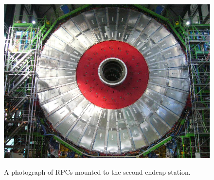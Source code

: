 \begin{figure}[H]
    \centering
    {\includegraphics[width=1\textwidth]{Images/CMS/RE.png}}
    \caption{A photograph of RPCs mounted to the second endcap station.}
    \label{fig:RPC}
\end{figure}